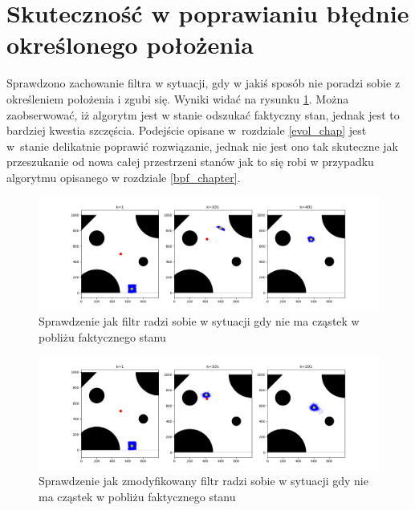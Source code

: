 \section{Skuteczność w poprawianiu błędnie określonego położenia}
Sprawdzono zachowanie filtra w sytuacji, gdy w jakiś sposób nie poradzi sobie z określeniem położenia i zgubi się. Wyniki widać na rysunku \ref{lost}. Można zaobserwować, iż algorytm jest w stanie odszukać faktyczny stan, jednak jest to bardziej kwestia szczęścia. Podejście opisane w~rozdziale \ref{evol_chap} jest w~stanie delikatnie poprawić rozwiązanie, jednak nie jest ono tak skuteczne jak przeszukanie od nowa całej przestrzeni stanów jak to się robi w przypadku algorytmu opisanego w rozdziale \ref{bpf_chapter}.
\begin{figure}[H]
	\begin{center}
		\includegraphics[width=15cm]{./lost.png}
		\caption{Sprawdzenie jak filtr radzi sobie w sytuacji gdy nie ma cząstek w pobliżu faktycznego stanu}
		\label{lost}
	\end{center}
\end{figure}
\begin{figure}[H]
	\begin{center}
		\includegraphics[width=15cm]{./lost_evol.png}
		\caption{Sprawdzenie jak zmodyfikowany filtr radzi sobie w sytuacji gdy nie ma cząstek w pobliżu faktycznego stanu}
		\label{lost_evol}
	\end{center}
\end{figure}
